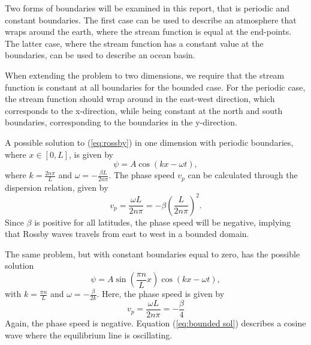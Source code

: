 Two forms of boundaries will be examined in this report, that is periodic and constant boundaries. The first case can be used to describe an atmosphere that wraps around the earth, where the stream function is equal at the end-points. The latter case, where the stream function has a constant value at the boundaries, can be used to describe an ocean basin.

When extending the problem to two dimensions, we require that the stream function is constant at all boundaries for the bounded case. For the periodic case, the stream function should wrap around in the east-west direction, which corresponds to the x-direction, while being constant at the north and south boundaries, corresponding to the boundaries in the y-direction.

A possible solution to (\ref{eq:rossby}) in one dimension with periodic boundaries, where $x \in \left[0,L \right] $, is given by
\begin{equation}\label{eq:periodic sol}
	\psi = A\cos{\left(kx-\omega t\right)},
\end{equation}
where $k=\frac{2n\pi}{L}$ and $\omega = - \frac{\beta L}{2n\pi}$. The phase speed $v_p$ can be calculated through the dispersion relation, given by
\begin{equation}
	v_p = \frac{\omega L}{2n\pi}=-\beta \left(\frac{L}{2n\pi}\right)^2.
\end{equation}
Since $\beta$ is positive for all latitudes, the phase speed will be negative, implying that Rossby waves travels from east to west in a bounded domain.

The same problem, but with constant boundaries equal to zero, has the possible solution
\begin{equation}\label{eq:bounded sol}
	\psi = A\sin\left(\frac{\pi n}{L}x\right)\cos\left(kx-\omega t\right),
\end{equation}
with $k = \frac{\pi n}{L}$ and $\omega = - \frac{\beta}{2k}$. Here, the phase speed is given by
\begin{equation}
	\label{eq:phasespeed}
	v_p = \frac{\omega L}{2n\pi} = - \frac{\beta}{4}
\end{equation}
Again, the phase speed is negative. Equation (\ref{eq:bounded sol}) describes a cosine wave where the equilibrium line is oscillating.  


